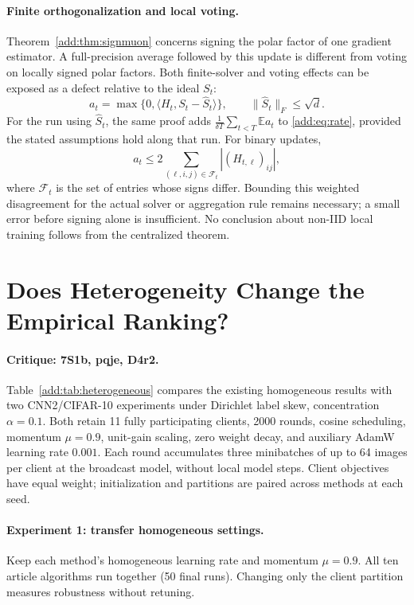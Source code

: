 \paragraph{Finite orthogonalization and local voting.}
Theorem~\ref{add:thm:signmuon} concerns signing the polar factor of one
gradient estimator. A full-precision average followed by this update is
different from voting on locally signed polar factors. Both finite-solver
and voting effects can be exposed as a defect relative to the ideal $S_t$:
\[
 a_t=\max\{0,\langle H_t,S_t-\widehat S_t\rangle\},
 \qquad\|\widehat S_t\|_F\le\sqrt d.
\]
For the run using $\widehat S_t$, the same proof adds
$\frac1{\delta T}\sum_{t<T}\mathbb E a_t$ to
\eqref{add:eq:rate}, provided the stated assumptions hold along that run.
For binary updates,
\[
 a_t\le2\sum_{(\ell,i,j)\in\mathcal F_t}|(H_{t,\ell})_{ij}|,
\]
where $\mathcal F_t$ is the set of entries whose signs differ.
Bounding this weighted disagreement for the actual solver or aggregation
rule remains necessary; a small error before signing alone is insufficient.
No conclusion about non-IID local training follows from the centralized
theorem.

\section{Does Heterogeneity Change the Empirical Ranking?}
\label{add:heterogeneous}
\paragraph{Critique: 7S1b, pqje, D4r2.}
Table~\ref{add:tab:heterogeneous} compares the existing homogeneous results
with two CNN2/CIFAR-10 experiments under Dirichlet label skew, concentration
$\alpha=0.1$. Both retain 11 fully participating clients, 2000 rounds,
cosine scheduling, momentum $\mu=0.9$, unit-gain scaling, zero weight decay, and auxiliary
AdamW learning rate $0.001$. Each round accumulates three minibatches of
up to 64 images per client at the broadcast model, without local model steps.
Client objectives have equal weight; initialization and partitions are
paired across methods at each seed.

\paragraph{Experiment 1: transfer homogeneous settings.}
Keep each method's homogeneous learning rate and momentum $\mu=0.9$.
All ten article algorithms run together (50 final runs). Changing only
the client partition measures robustness without retuning.


